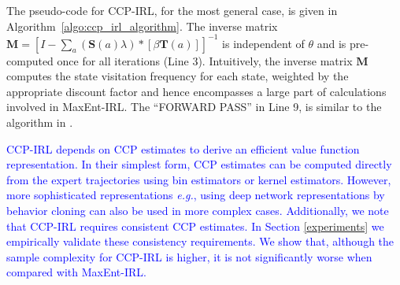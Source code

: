 \documentclass{article}
\begin{document}
The pseudo-code for CCP-IRL, for the most general case, is given in Algorithm~\ref{algo:ccp_irl_algorithm}.
The inverse matrix $\mathbf{M}=\left[I-\sum_{a}(\mathbf{S}(a) \lambda) *\left[ \beta \mathbf{T}(a)  \right]\right]^{-1}$ is independent of $\theta$ and is pre-computed once for all iterations (Line 3).
Intuitively, the inverse matrix $\mathbf{M}$ computes the state visitation frequency for each state, weighted by the appropriate discount factor and hence encompasses a large part of calculations involved in MaxEnt-IRL. The ``FORWARD PASS'' in Line 9, is similar to the algorithm in \cite{kitani2012activity}.

\textcolor{blue}{
CCP-IRL depends on CCP estimates to derive an efficient value function representation. In their simplest form, CCP estimates can be computed directly from the expert trajectories using bin estimators or kernel estimators. However, more sophisticated representations \emph{e.g.}, using deep network representations by behavior cloning can also be used in more complex cases. Additionally, we note that CCP-IRL requires consistent CCP estimates. In Section \ref{experiments} we empirically validate these consistency requirements. We show that, although the sample complexity for CCP-IRL is higher, it is not significantly worse when compared with MaxEnt-IRL.
}


\end{document}
